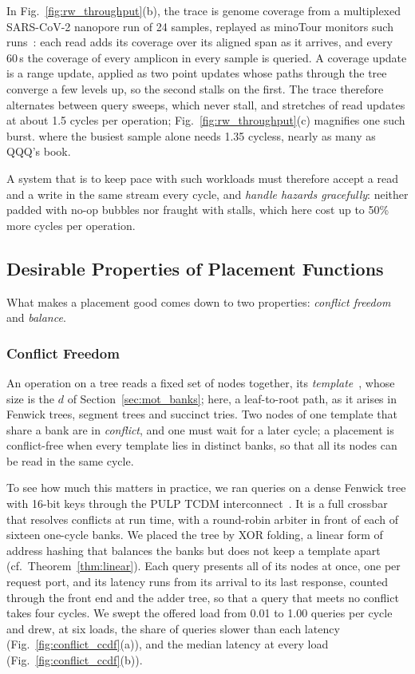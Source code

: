 In Fig.~\ref{fig:rw_throughput}(b), the trace is genome coverage from a
multiplexed SARS-CoV-2 nanopore run of 24 samples, replayed as minoTour
monitors such runs~\cite{munro2023}: each read adds its coverage over its
aligned span as it arrives, and every 60\,s the coverage of every amplicon in
every sample is queried. A coverage update is a range update, applied as two
point updates whose paths through the tree converge a few levels up, so the
second stalls on the first. The trace therefore alternates between query
sweeps, which never stall, and stretches of read updates at about 1.5 cycles
per operation; Fig.~\ref{fig:rw_throughput}(c) magnifies one such burst.
where the busiest sample alone needs 1.35 cycless, nearly as many as
QQQ's book.

A system that is to keep pace with such workloads must therefore accept a
read and a write in the same stream every cycle, and \emph{handle hazards
	gracefully}: neither padded with no-op bubbles nor fraught with stalls, which
here cost up to 50\% more cycles per operation.

\subsection{Desirable Properties of Placement Functions}\label{sec:mot_conflict}

What makes a placement good comes down to two properties: \emph{conflict
	freedom} and \emph{balance}.

\subsubsection{Conflict Freedom}

An operation on a tree reads a fixed set of nodes together, its
\emph{template}~\cite{das2000mappings}, whose size is the $d$ of
Section~\ref{sec:mot_banks}; here, a leaf-to-root path, as it arises in
Fenwick trees, segment trees and succinct tries. Two nodes of one template
that share a bank are in \emph{conflict}, and one must wait for a later cycle;
a placement is conflict-free when every template lies in distinct banks, so
that all its nodes can be read in the same cycle.

To see how much this matters in practice, we ran queries on a dense Fenwick
tree with 16-bit keys through the PULP TCDM
interconnect~\cite{pulp_tcdm,pulp_cluster_interconnect}. It is a full crossbar
that resolves conflicts at run time, with a round-robin arbiter in front of
each of sixteen one-cycle banks. We placed the tree by XOR folding, a linear
form of address hashing that balances the banks but does not keep a template
apart (cf.~Theorem~\ref{thm:linear}). Each query presents all of its nodes at
once, one per request port, and its latency runs from its arrival to its last
response, counted through the front end and the adder tree, so that a query
that meets no conflict takes four cycles. We swept the offered load from 0.01
to 1.00 queries per cycle and drew, at six loads, the share of queries slower
than each latency (Fig.~\ref{fig:conflict_ccdf}(a)), and the median latency at
every load (Fig.~\ref{fig:conflict_ccdf}(b)).


